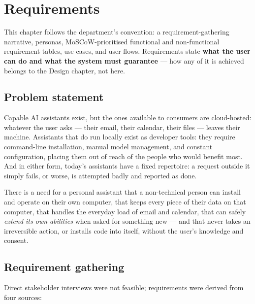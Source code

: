 \documentclass[12pt]{article}
\begin{document}
\section{Requirements}\label{sec:requirements}

This chapter follows the department's convention: a requirement-gathering
narrative, personas, MoSCoW-prioritised functional and non-functional
requirement tables, use cases, and user flows. Requirements state
\textbf{what the user can do and what the system must guarantee} --- how any
of it is achieved belongs to the Design chapter, not here.

\subsection{Problem statement}\label{sec:problem-statement}

Capable AI assistants exist, but the ones available to consumers are
cloud-hosted: whatever the user asks --- their email, their calendar, their
files --- leaves their machine. Assistants that do run locally exist as
developer tools: they require command-line installation, manual model
management, and constant configuration, placing them out of reach of the
people who would benefit most. And in either form, today's assistants have a
fixed repertoire: a request outside it simply fails, or worse, is attempted
badly and reported as done.

There is a need for a personal assistant that a non-technical person can
install and operate on their own computer, that keeps every piece of their
data on that computer, that handles the everyday load of email and calendar,
that can safely \emph{extend its own abilities} when asked for something new
--- and that never takes an irreversible action, or installs code into
itself, without the user's knowledge and consent.

\subsection{Requirement gathering}\label{sec:requirement-gathering}

Direct stakeholder interviews were not feasible; requirements were derived
from four sources:
\end{document}

